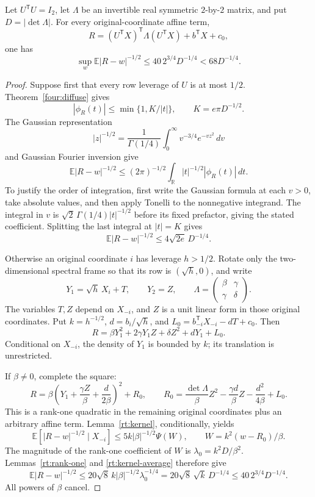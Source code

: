 \begin{theorem}
\label{rt:half}
Let \(U^{\mathsf T}U=I_2\), let \(\Lambda\) be an
invertible real symmetric \(2\)-by-\(2\) matrix, and
put \(D=|\det\Lambda|\).
For every original-coordinate affine term,
\[
 R=(U^{\mathsf T}X)^{\mathsf T}\Lambda(U^{\mathsf T}X)
       +b^{\mathsf T}X+c_0,
\]
one has
\begin{equation}
 \sup_w\mathbb E|R-w|^{-1/2}
 \leq40\,2^{3/4}D^{-1/4}<68D^{-1/4}.
 \label{eq:rank-two-half}
\end{equation}
\end{theorem}
\begin{proof}
Suppose first that every row leverage of \(U\) is at
most \(1/2\).
Theorem~\ref{four:diffuse} gives
\[
 |\phi_R(t)|\leq\min\{1,K/|t|\},
 \qquad K=e\pi D^{-1/2}.
\]
The Gaussian representation
\[
 |z|^{-1/2}
 =\frac1{\Gamma(1/4)}
   \int_0^\infty v^{-3/4}e^{-vz^2}\,dv
\]
and Gaussian Fourier inversion give
\[
 \mathbb E|R-w|^{-1/2}
 \leq(2\pi)^{-1/2}
       \int_{\mathbb R}|t|^{-1/2}|\phi_R(t)|\,dt.
\]
To justify the order of integration, first write the
Gaussian formula at each \(v>0\), take absolute values,
and then apply Tonelli to the nonnegative integrand.
The integral in \(v\) is
\(\sqrt2\,\Gamma(1/4)|t|^{-1/2}\) before its fixed
prefactor, giving the stated coefficient.
Splitting the last integral at \(|t|=K\) gives
\[
 \mathbb E|R-w|^{-1/2}
 \leq4\sqrt{2e}\,D^{-1/4}.
\]

Otherwise an original coordinate \(i\) has leverage
\(h>1/2\).  Rotate only the two-dimensional spectral
frame so that its row is \((\sqrt h,0)\), and write
\[
 Y_1=\sqrt h\,X_i+T,\qquad Y_2=Z,\qquad
 \Lambda=\begin{pmatrix}\beta&\gamma\\\gamma&\delta\end{pmatrix}.
\]
The variables \(T,Z\) depend on \(X_{-i}\), and \(Z\)
is a unit linear form in those original coordinates.
Put \(k=h^{-1/2}\), \(d=b_i/\sqrt h\), and
\(L_0=b_{-i}^{\mathsf T}X_{-i}-dT+c_0\).
Then
\[
 R=\beta Y_1^2+2\gamma Y_1Z+\delta Z^2+dY_1+L_0.
\]
Conditional on \(X_{-i}\), the density of \(Y_1\) is
bounded by \(k\); its translation is unrestricted.

If \(\beta\ne0\), complete the square:
\[
 R=\beta\left(Y_1+\frac{\gamma Z}{\beta}
                    +\frac d{2\beta}\right)^2+R_0,
 \qquad
 R_0=\frac{\det\Lambda}{\beta}Z^2
       -\frac{\gamma d}{\beta}Z-\frac{d^2}{4\beta}+L_0 .
\]
This is a rank-one quadratic in the remaining original
coordinates plus an arbitrary affine term.
Lemma~\ref{rt:kernel}, conditionally, yields
\[
 \mathbb E[|R-w|^{-1/2}\mid X_{-i}]
 \leq5k|\beta|^{-1/2}\Psi(W),
 \qquad W=k^2(w-R_0)/\beta .
\]
The magnitude of the rank-one coefficient of \(W\) is
\(\lambda_0=k^2D/\beta^2\).
Lemmas~\ref{rt:rank-one} and \ref{rt:kernel-average}
therefore give
\[
 \mathbb E|R-w|^{-1/2}
 \leq20\sqrt8\,k|\beta|^{-1/2}\lambda_0^{-1/4}
 =20\sqrt8\,\sqrt k\,D^{-1/4}
 \leq40\,2^{3/4}D^{-1/4}.
\]
All powers of \(\beta\) cancel.


\end{proof}
